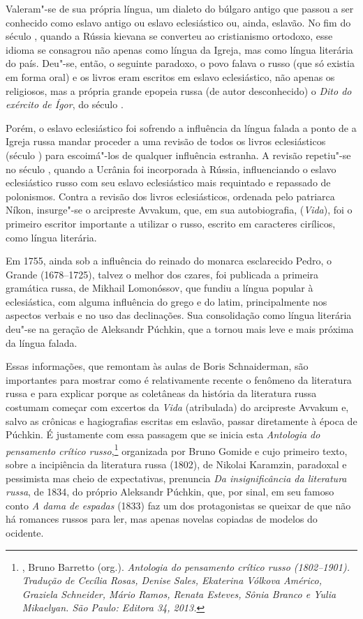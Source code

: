 {{{Valeram"-se de sua própria língua, um dialeto do búlgaro antigo que
passou a ser conhecido como eslavo antigo ou eslavo eclesiástico ou,
ainda, eslavão. No fim do século , quando a Rússia kievana se
converteu ao cristianismo ortodoxo, esse idioma se consagrou não apenas
como língua da Igreja, mas como língua literária do país. Deu"-se, então,
o seguinte paradoxo, o povo falava o russo (que só existia em forma
oral) e os livros eram
escritos em eslavo eclesiástico, não apenas os religiosos, mas a própria
grande epopeia russa (de autor desconhecido) o \emph{Dito do exército de
Ígor}, do século .

Porém, o eslavo eclesiástico foi sofrendo a influência da língua falada
a ponto de a Igreja russa mandar proceder a uma revisão de todos os
livros eclesiásticos (século ) para escoimá"-los de qualquer
influência estranha. A revisão repetiu"-se no século , quando a
Ucrânia foi incorporada à Rússia, influenciando o eslavo eclesiástico
russo com seu eslavo eclesiástico mais requintado e repassado de
polonismos. Contra a revisão dos livros eclesiásticos, ordenada pelo
patriarca Níkon, insurge"-se o arcipreste Avvakum, que, em sua
autobiografia, (\emph{Vida}), foi o primeiro escritor importante a
utilizar o russo, escrito em caracteres cirílicos, como língua literária.

Em 1755, ainda sob a influência do reinado do monarca esclarecido Pedro, o
Grande (1678--1725), talvez o melhor dos czares, foi publicada a primeira
gramática russa, de Mikhail Lomonóssov, que fundiu a língua popular à
eclesiástica, com alguma influência do grego e do latim,
 principalmente nos aspectos verbais e no uso das declinações. Sua
consolidação como língua literária deu"-se na geração de Aleksandr Púchkin, que a tornou mais leve e mais
próxima da língua falada.

Essas informações, que remontam às aulas de Boris Schnaiderman, são
importantes para mostrar como é relativamente recente o fenômeno da
literatura russa e para explicar porque as coletâneas da história
da literatura russa costumam começar com excertos da \emph{Vida} (atribulada) do arcipreste Avvakum e, salvo as crônicas e hagiografias
escritas em eslavão, passar diretamente à época de Púchkin. É
justamente com essa passagem que se inicia esta \emph{Antologia do
pensamento crítico russo},\footnote{, Bruno Barretto
 (org.). \emph{Antologia do pensamento crítico russo (1802--1901).
 Tradução de Cecília Rosas, Denise Sales, Ekaterina Vólkova Américo,
 Graziela Schneider, Mário Ramos, Renata Esteves, Sônia Branco e Yulia
 Mikaelyan. São Paulo: Editora 34, 2013.}} organizada por Bruno Gomide e cujo
primeiro texto, sobre a incipiência da literatura russa (1802), de
Nikolai Karamzin, paradoxal e pessimista mas cheio de expectativas,
prenuncia \emph{Da insignificância da literatura russa}, de 1834, do
próprio Aleksandr Púchkin, que, por sinal, em seu famoso conto \emph{A dama
de espadas} (1833) faz um dos protagonistas se queixar de que não há romances
russos para ler, mas apenas novelas copiadas de modelos do ocidente.

}}}
